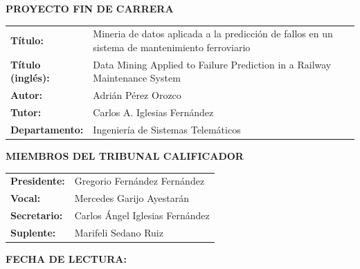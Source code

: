 \thispagestyle{empty}
\vspace*{3\baselineskip}
{\large{\bf PROYECTO FIN DE CARRERA}}
\vspace{0.5cm}

\begin{rm}
\begin{tabular}{p{3cm}p{10cm}}
\textbf{Título:} & Mineria de datos aplicada a la predicción de fallos en un sistema de mantenimiento ferroviario\\ 
\textbf{Título (inglés):} & Data Mining Applied to Failure Prediction in a Railway Maintenance System\\ 
\textbf{Autor:} & Adrián Pérez Orozco \\ 
\textbf{Tutor:} & Carlos A. Iglesias Fernández\\ 
\textbf{Departamento:} & Ingeniería de Sistemas Telemáticos \\ 
\end{tabular} \end{rm} \vspace{1cm}

{\large{\bf MIEMBROS DEL TRIBUNAL CALIFICADOR}} \vspace{0.5cm}

\begin{rm}
\begin{tabular}{p{3cm}p{10cm}}
\textbf{Presidente:} & Gregorio Fernández Fernández\\
\textbf{Vocal:} & Mercedes Garijo Ayestarán\\
\textbf{Secretario:} & Carlos Ángel Iglesias Fernández\\
\textbf{Suplente:} & Marifeli Sedano Ruiz
\end{tabular}
\end{rm}
\vspace{1cm}

{\large{\bf FECHA DE LECTURA:}}
\vspace{1cm}

